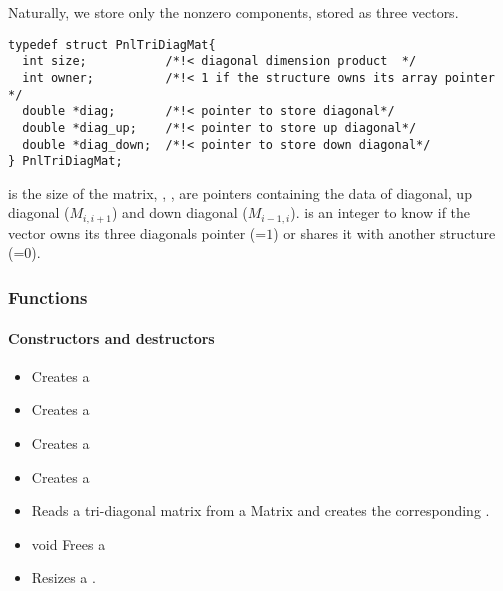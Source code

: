 Naturally, we store only the nonzero components, stored as three vectors.

\begin{verbatim}
typedef struct PnlTriDiagMat{
  int size;           /*!< diagonal dimension product  */
  int owner;          /*!< 1 if the structure owns its array pointer */
  double *diag;       /*!< pointer to store diagonal*/
  double *diag_up;    /*!< pointer to store up diagonal*/
  double *diag_down;  /*!< pointer to store down diagonal*/
} PnlTriDiagMat;
\end{verbatim}
 is the size of the matrix, , ,   are pointers containing the
data of diagonal, up diagonal ($M_{i, i+1}$) and  down diagonal ($M_{i-1, i}$).
 is an integer to know if the vector owns its three diagonals
pointer (=$1$) or shares it with another structure (=$0$).

\subsubsection{Functions}
\paragraph{Constructors and destructors}
\begin{itemize}
\item 
  \sshortdescribe Creates a   
\item {}
  \sshortdescribe Creates a   
\item {}
  \sshortdescribe Creates a   
\item {}
  \sshortdescribe Creates a   
\item {}
  \sshortdescribe Reads a tri-diagonal matrix from a Matrix and creates
  the corresponding .
\item void 
  \sshortdescribe Frees a   
\item {}
  \sshortdescribe Resizes a .  
\end{itemize}

